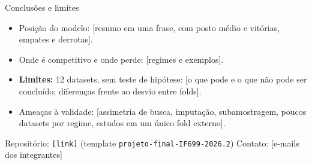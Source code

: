 \documentclass[aspectratio=169,11pt]{beamer}
\begin{document}
\begin{frame}{Conclusões e limites}
    \begin{itemize}
        \item Posição do modelo: [resumo em uma frase, com posto médio e vitórias, empates e derrotas].
        \item Onde é competitivo e onde perde: [regimes e exemplos].
        \item \textbf{Limites:} 12 datasets, sem teste de hipótese: [o que pode e o que não pode ser concluído; diferenças frente ao desvio entre folds].
        \item Ameaças à validade: [assimetria de busca, imputação, subamostragem, poucos datasets por regime, estudos em um único fold externo].
    \end{itemize}
    \vspace{0.3em}
    \footnotesize Repositório: \texttt{[link]} (template \texttt{projeto-final-IF699-2026.2}) \quad Contato: [e-mails dos integrantes]
\end{frame}
\end{document}

